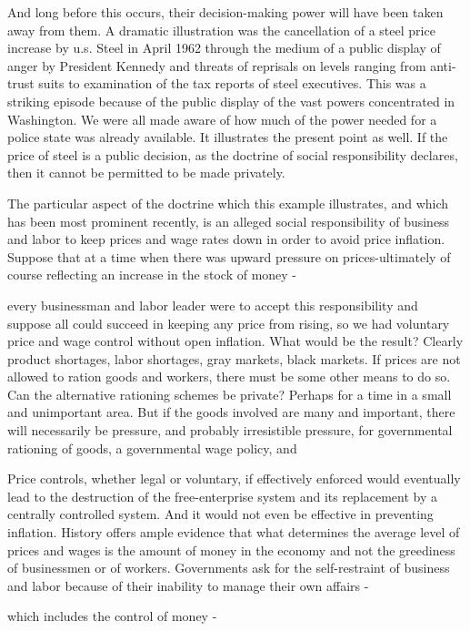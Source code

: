 \documentclass[11pt,openany]{book}
\begin{document}
And long before this occurs, their decision-making power will have been taken away from them. A dramatic illustration was the cancellation of a steel price increase by u.s. Steel in April 1962 through the medium of a public display of anger by President Kennedy and threats of reprisals on levels ranging from anti-trust suits to examination of the tax reports of steel executives. This was a striking episode because of the public display of the vast powers concentrated in Washington. We were all made aware of how much of the power needed for a police state was already available. It illustrates the present point as well. If the price of steel is a public decision, as the doctrine of social responsibility declares, then it cannot be permitted to be made privately.

The particular aspect of the doctrine which this example illustrates, and which has been most prominent recently, is an alleged social responsibility of business and labor to keep prices and wage rates down in order to avoid price inflation. Suppose that at a time when there was upward pressure on prices-ultimately of course reflecting an increase in the stock of money -

every businessman and labor leader were to accept this responsibility and suppose all could succeed in keeping any price from rising, so we had voluntary price and wage control without open inflation. What would be the result? Clearly product shortages, labor shortages, gray markets, black markets. If prices are not allowed to ration goods and workers, there must be some other means to do so. Can the alternative rationing schemes be private? Perhaps for a time in a small and unimportant area. But if the goods involved are many and important, there will necessarily be pressure, and probably irresistible pressure, for governmental rationing of goods, a governmental wage policy, and

Price controls, whether legal or voluntary, if effectively enforced would eventually lead to the destruction of the free-enterprise system and its replacement by a centrally controlled system. And it would not even be effective in preventing inflation. History offers ample evidence that what determines the average level of prices and wages is the amount of money in the economy and not the greediness of businessmen or of workers. Governments ask for the self-restraint of business and labor because of their inability to manage their own affairs -

which includes the control of money -
\end{document}
